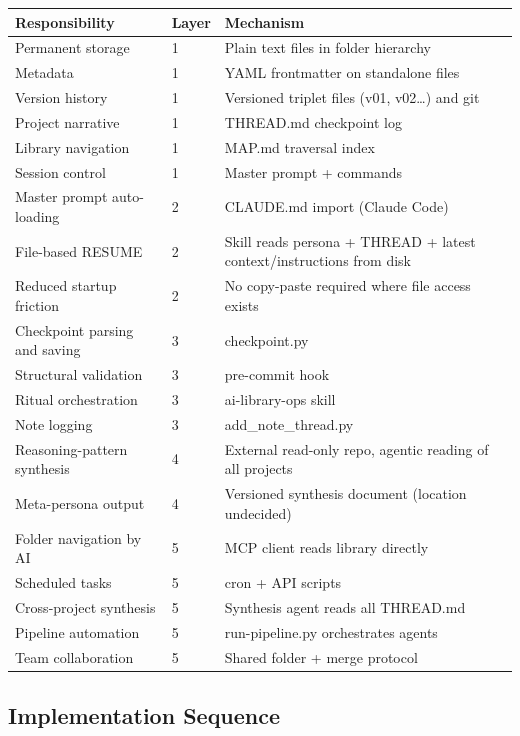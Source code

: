 \documentclass[12pt,letterpaper]{article}
\begin{document}
\begin{center}
\begin{tabular}{@{}p{3.5cm}p{2cm}p{7cm}@{}}
\toprule
\textbf{Responsibility} & \textbf{Layer} & \textbf{Mechanism} \\
\midrule
Permanent storage & 1 & Plain text files in folder hierarchy \\
Metadata & 1 & YAML frontmatter on standalone files \\
Version history & 1 & Versioned triplet files (v01, v02\ldots) and git \\
Project narrative & 1 & THREAD.md checkpoint log \\
Library navigation & 1 & MAP.md traversal index \\
Session control & 1 & Master prompt + commands \\
\midrule
Master prompt auto-loading & 2 & CLAUDE.md import (Claude Code) \\
File-based RESUME & 2 & Skill reads persona + THREAD + latest context/instructions from disk \\
Reduced startup friction & 2 & No copy-paste required where file access exists \\
\midrule
Checkpoint parsing and saving & 3 & checkpoint.py \\
Structural validation & 3 & pre-commit hook \\
Ritual orchestration & 3 & ai-library-ops skill \\
Note logging & 3 & add\_note\_thread.py \\
\midrule
Reasoning-pattern synthesis & 4 & External read-only repo, agentic reading of all projects \\
Meta-persona output & 4 & Versioned synthesis document (location undecided) \\
\midrule
Folder navigation by AI & 5 & MCP client reads library directly \\
Scheduled tasks & 5 & cron + API scripts \\
Cross-project synthesis & 5 & Synthesis agent reads all THREAD.md \\
Pipeline automation & 5 & run-pipeline.py orchestrates agents \\
Team collaboration & 5 & Shared folder + merge protocol \\
\bottomrule
\end{tabular}
\end{center}

\subsection{Implementation Sequence}
\end{document}
